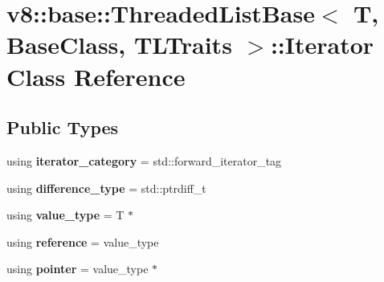 \hypertarget{classv8_1_1base_1_1ThreadedListBase_1_1Iterator}{}\section{v8\+:\+:base\+:\+:Threaded\+List\+Base$<$ T, Base\+Class, T\+L\+Traits $>$\+:\+:Iterator Class Reference}
\label{classv8_1_1base_1_1ThreadedListBase_1_1Iterator}
\subsection*{Public Types}
\begin{DoxyCompactItemize}
\item 
\mbox{\label{classv8_1_1base_1_1ThreadedListBase_1_1Iterator_ae3140b417a1068e893c0bb5a0216d9be}} 
using {\bfseries iterator\+\_\+category} = std\+::forward\+\_\+iterator\+\_\+tag
\item 
\mbox{\label{classv8_1_1base_1_1ThreadedListBase_1_1Iterator_a71f874ccee1fc7db1db8cfbb68b8c36c}} 
using {\bfseries difference\+\_\+type} = std\+::ptrdiff\+\_\+t
\item 
\mbox{\label{classv8_1_1base_1_1ThreadedListBase_1_1Iterator_ace0085141d3a6f45a751a0cd782bdb8d}} 
using {\bfseries value\+\_\+type} = T $\ast$
\item 
\mbox{\label{classv8_1_1base_1_1ThreadedListBase_1_1Iterator_a99944e9c74da84b8a078c4fd3118482c}} 
using {\bfseries reference} = value\+\_\+type
\item 
\mbox{\label{classv8_1_1base_1_1ThreadedListBase_1_1Iterator_ab93b8e5172ca5bf99d60786ff50c044a}} 
using {\bfseries pointer} = value\+\_\+type $\ast$
\end{DoxyCompactItemize}

